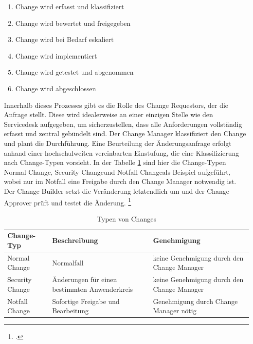 \begin{enumerate}
	\item Change wird erfasst und klassifiziert
	\item Change wird bewertet und freigegeben
	\item Change wird bei Bedarf eskaliert
	\item Change wird implementiert
	\item Change wird getestet und abgenommen
	\item Change wird abgeschlossen
\end{enumerate}

Innerhalb dieses Prozesses gibt es die Rolle des Change Requestors, der die Anfrage stellt. Diese wird idealerweise an einer einzigen Stelle wie den Servicedesk aufgegeben, um sicherzustellen, dass alle Anforderungen vollständig erfasst und zentral gebündelt sind. Der Change Manager klassifiziert den Change und plant die Durchführung. Eine Beurteilung der Änderungsanfrage erfolgt anhand einer hochschulweiten vereinbarten Einstufung, die eine Klassifizierung nach Change-Typen vorsieht. In der Tabelle \ref{tab_typen_von_changes} sind hier die Change-Typen \glqq Normal Change\grqq, \glqq Security Change\grqq und \glqq Notfall Change\grqq als Beispiel aufgeführt, wobei nur im Notfall eine Freigabe durch den Change Manager notwendig ist. Der Change Builder setzt die Veränderung letztendlich um und der Change Approver prüft und testet die Änderung. \footcite[Vgl.][48]{breiter_implementierung_2011}

\begin{table}[h!]
	\begin{tabularx}{\textwidth}{|X|X|X|}
		\hline \textbf{Change-Typ} & \textbf{Beschreibung} & \textbf{Genehmigung}\\
		\hline Normal Change & Normalfall & keine Genehmigung durch den Change Manager\\ 
		\hline Security Change & Änderungen für einen bestimmten Anwenderkreis & keine Genehmigung 			durch den Change Manager\\
		\hline Notfall Change & Sofortige Freigabe und Bearbeitung & Genehmigung durch Change 				Manager nötig\\
		\hline
	\end{tabularx}
	\caption{Typen von Changes}
	\label{tab_typen_von_changes}
\end{table}


